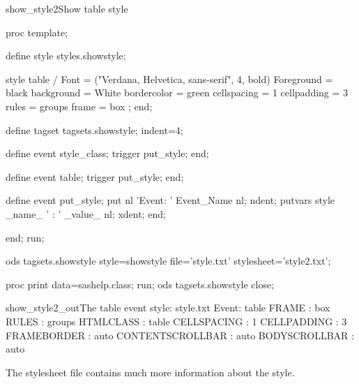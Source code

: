 \begin{fvcode}{show_style2}{Show table style}

proc template;

    define style styles.showstyle;

        style table /
          Font = ("Verdana, Helvetica, sans-serif", 4, bold)
          Foreground = black
          background = White
          bordercolor = green
          cellspacing = 1
          cellpadding = 3
          rules = groups
          frame = box
        ;
    end;

    define tagset tagsets.showstyle;
        indent=4;

        define event style_class;
           trigger put_style;
        end;

        define event table;
           trigger put_style;
        end;

        define event put_style;
            put nl 'Event: ' Event_Name nl;
            ndent;
            putvars style _name_ ' : ' _value_ nl;
            xdent;
        end;

     end;
run;

ods tagsets.showstyle style=showstyle 
                      file='style.txt' 
                stylesheet='style2.txt';

proc print data=sashelp.class; run;
ods tagsets.showstyle close;

\end{fvcode}
       
\begin{poutput}{show_style2_out}{The table event style: style.txt}
Event: table
    FRAME : box
    RULES : groups
    HTMLCLASS : table
    CELLSPACING : 1
    CELLPADDING : 3
    FRAMEBORDER : auto
    CONTENTSCROLLBAR : auto
    BODYSCROLLBAR : auto
\end{poutput}

The stylesheet file contains much more information about the style.


